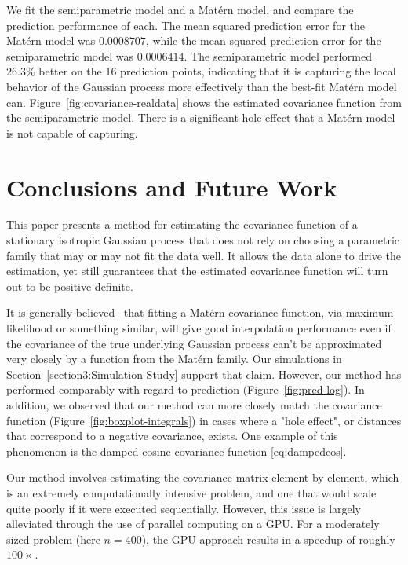 \documentclass[12pt]{article}
\begin{document}
We fit the semiparametric model and a Mat\'ern model, and compare the prediction performance of each. The mean squared prediction error for the Mat\'ern model was $0.0008707$, while the mean squared prediction error for the semiparametric model was $0.0006414$. The semiparametric model performed $26.3\%$ better on the 16 prediction points, indicating that it is capturing the local behavior of the Gaussian process more effectively than the best-fit Mat\'ern model can. Figure~\ref{fig:covariance-realdata} shows the estimated covariance function from the semiparametric model. There is a significant hole effect that a Mat\'ern model is not capable of capturing.


\section{Conclusions and Future Work}
\label{section5:Conclusions}

This paper presents a method for estimating the covariance function of a stationary isotropic Gaussian process that does not rely on choosing a parametric family that may or may not fit the data well. It allows the data alone to drive the estimation, yet still guarantees that the estimated covariance function will turn out to be positive definite.

It is generally believed~\cite{Stein1999} that fitting a Mat\'ern covariance function, via maximum likelihood or something similar, will give good interpolation performance even if the covariance of the true underlying Gaussian process can't be approximated very closely by a function from the Mat\'ern family. Our simulations in Section~\ref{section3:Simulation-Study} support that claim. However, our method has performed comparably with regard to prediction (Figure~\ref{fig:pred-log}). In addition, we observed that our method can more closely match the covariance function (Figure~\ref{fig:boxplot-integrals}) in cases where a "hole effect", or distances that correspond to a negative covariance, exists. One example of this phenomenon is the damped cosine covariance function \eqref{eq:dampedcos}.

Our method involves estimating the covariance matrix element by element, which is an extremely computationally intensive problem, and one that would scale quite poorly if it were executed sequentially. However, this issue is largely alleviated through the use of parallel computing on a GPU. For a moderately sized problem (here $n = 400$), the GPU approach results in a speedup of roughly $100\times$. %
\end{document}
